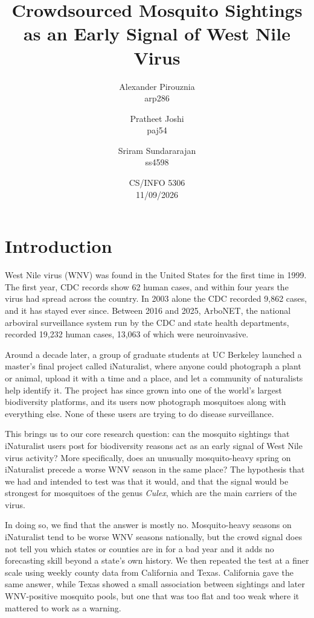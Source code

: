 \documentclass[11pt]{article}
\title{\vspace{-1.5em}Crowdsourced Mosquito Sightings as an Early Signal of West Nile Virus}
\author{Alexander Pirouznia \\ \small arp286 \and Pratheet Joshi \\ \small paj54 \and Sriram Sundararajan \\ \small ss4598}
\date{CS/INFO 5306 \\ 11/09/2026}
\begin{document}
\maketitle

\section{Introduction}
West Nile virus (WNV) was found in the United States for the first time in 1999. The first year, CDC records show 62 human cases, and within four years the virus had spread across the country. In 2003 alone the CDC recorded 9,862 cases,\cite{cdc_historic} and it has stayed ever since. Between 2016 and 2025, ArboNET, the national arboviral surveillance system run by the CDC and state health departments, recorded 19,232 human cases, 13,063 of which were neuroinvasive.\cite{cdc_historic}

Around a decade later, a group of graduate students at UC Berkeley launched a master's final project called iNaturalist,\cite{inat_about} where anyone could photograph a plant or animal, upload it with a time and a place, and let a community of naturalists help identify it. The project has since grown into one of the world's largest biodiversity platforms, and its users now photograph mosquitoes along with everything else. None of these users are trying to do disease surveillance.

This brings us to our core research question: can the mosquito sightings that iNaturalist users post for biodiversity reasons act as an early signal of West Nile virus activity? More specifically, does an unusually mosquito-heavy spring on iNaturalist precede a worse WNV season in the same place? The hypothesis that we had and intended to test was that it would, and that the signal would be strongest for mosquitoes of the genus \textit{Culex}, which are the main carriers of the virus.

In doing so, we find that the answer is mostly no. Mosquito-heavy seasons on iNaturalist tend to be worse WNV seasons nationally, but the crowd signal does not tell you which states or counties are in for a bad year and it adds no forecasting skill beyond a state's own history. We then repeated the test at a finer scale using weekly county data from California and Texas. California gave the same answer, while Texas showed a small association between sightings and later WNV-positive mosquito pools, but one that was too flat and too weak where it mattered to work as a warning.
\end{document}
